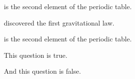 \documentclass{exam}
\newcommand{\tf}[1][{}]{%
   \fillin[#1][0.25in]%
}
\begin{document}
\begin{questions}
\begin{minipage}{\linewidth}

  \question \fillin[Helium] is the second element of the periodic table.

\end{minipage}


\begin{minipage}{\linewidth}

  \question {} discovered the first gravitational law.
  \printanswers

  \end{minipage}


\begin{minipage}{\linewidth}

  \question \fillin[Helium] is the second element of the periodic table.

  \end{minipage}



\begin{minipage}{\linewidth}

  \question \tf[T] This question is true.

\end{minipage}


\begin{minipage}{\linewidth}

  \question \tf[F] And this question is false.
  \printanswers
\end{minipage}


\end{questions}
\end{document}
